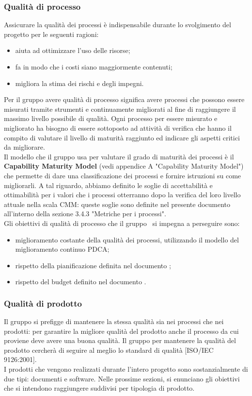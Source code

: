 \documentclass[../PianoDiQualifica.tex]{subfiles}
\begin{document}
		\subsubsection{Qualità di processo}
		Assicurare la qualità dei processi è indispensabile durante lo svolgimento del progetto per le seguenti ragioni:
		\begin{itemize}
		\item aiuta ad ottimizzare l'uso delle risorse;
		\item fa in modo che i costi siano maggiormente contenuti;
		\item migliora la stima dei rischi e degli impegni.
		\end{itemize}
		Per il gruppo avere qualità di processo significa avere processi che possono essere misurati tramite strumenti e continuamente migliorati al fine di raggiungere il massimo livello possibile di qualità. Ogni processo per essere misurato e migliorato ha bisogno di essere sottoposto ad attività di verifica che hanno il compito di valutare il livello di maturità raggiunto ed indicare gli aspetti critici da migliorare.\\
		Il modello che il gruppo usa per valutare il grado di maturità dei processi è il \textbf{Capability Maturity Model} (vedi appendice A "Capability Maturity Model") che permette di dare una classificazione dei processi e fornire istruzioni su come migliorarli. A tal riguardo, abbiamo definito le soglie di accettabilità e ottimabilità per i valori che i processi otterranno dopo la verifica del loro livello attuale nella scala CMM: queste soglie sono definite nel presente documento all'interno della sezione 3.4.3 "Metriche per i processi".\\
		Gli obiettivi di qualità di processo che il gruppo \leaf\ si impegna a perseguire sono:
		\begin{itemize}
			\item miglioramento costante della qualità dei processi, utilizzando il modello del miglioramento continuo PDCA;
			\item rispetto della pianificazione definita nel documento \pianodiprogettov;
			\item rispetto del budget definito nel documento \pianodiprogettov.
		\end{itemize}
		\subsubsection{Qualità di prodotto}
		Il gruppo si prefigge di mantenere la stessa qualità sia nei processi che nei prodotti: per garantire la migliore qualità del prodotto anche il processo da cui proviene deve avere una buona qualità. Il gruppo per mantenere la qualità del prodotto cercherà di seguire al meglio lo standard di qualità [ISO/IEC 9126:2001].\\
		I prodotti che vengono realizzati durante l'intero progetto sono sostanzialmente di due tipi: documenti e software. Nelle prossime sezioni, si enunciano gli obiettivi che si intendono raggiungere suddivisi per tipologia di prodotto.
\end{document}
